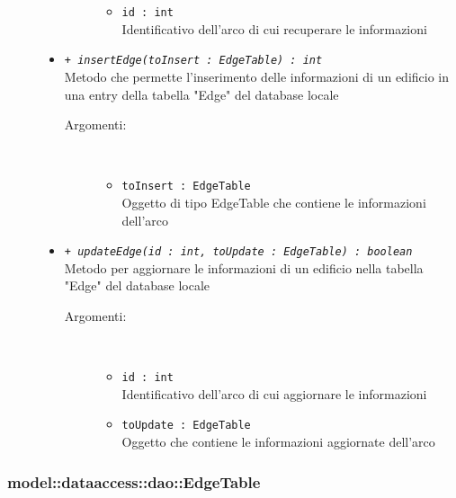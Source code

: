 \documentclass[../DefinizioneDiProdotto.tex]{subfiles}
\begin{document}
\begin{description}
\begin{itemize}
\begin{description}
\begin{itemize}
\item \texttt{id : int}\\
Identificativo dell'arco di cui recuperare le informazioni\end{itemize}
\end{description}
\item \texttt{+ \textit{insertEdge(toInsert : EdgeTable) : int}}\\
Metodo che permette l'inserimento delle informazioni di un edificio in una entry della tabella "Edge" del database locale
 \begin{description}
\item[Argomenti:] \
\begin{itemize}
\item \texttt{toInsert : EdgeTable}\\
Oggetto di tipo EdgeTable che contiene le informazioni dell'arco\end{itemize}
\end{description}
\item \texttt{+ \textit{updateEdge(id : int, toUpdate : EdgeTable) : boolean}}\\
Metodo per aggiornare le informazioni di un edificio nella tabella "Edge" del database locale
 \begin{description}
\item[Argomenti:] \
\begin{itemize}
\item \texttt{id : int}\\
Identificativo dell'arco di cui aggiornare le informazioni\item \texttt{toUpdate : EdgeTable}\\
Oggetto che contiene le informazioni aggiornate dell'arco\end{itemize}
\end{description}
\end{itemize}
\end{description}

\subsubsection{model::dataaccess::dao::EdgeTable}
\end{document}
